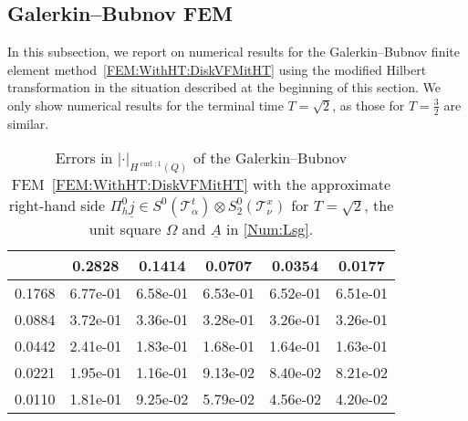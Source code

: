 \documentclass[a4paper,11pt]{article}
\newcommand{\cu}{\operatorname{curl}}
\renewcommand{\vec}[1]{\underline{#1}}
\newcommand{\abs}[1]{\left\lvert{#1}\right\rvert}
\begin{document}
\subsection{Galerkin--Bubnov FEM}

In this subsection, we report on numerical results for the Galerkin--Bubnov finite element method~\eqref{FEM:WithHT:DiskVFMitHT} using the modified Hilbert transformation in the situation described at the beginning of this section. We only show numerical results for the terminal time $T = \sqrt{2}$, as those for $T=\frac 3 2$ are similar.

\begin{table}[ht!]
	\begin{center}
		\begin{footnotesize}\begin{tabular}{r||c|c|c|c|c}
				\diagbox{$h_x$}{\vspace*{-.1cm}$h_t$} & 0.2828 & 0.1414 & 0.0707 & 0.0354 & 0.0177   \\
				\hline\hline
				0.1768 & 6.77e-01 & 6.58e-01 & 6.53e-01 & 6.52e-01 & 6.51e-01 \\
				0.0884 & 3.72e-01 & 3.36e-01 & 3.28e-01 & 3.26e-01 & 3.26e-01 \\
				0.0442 & 2.41e-01 & 1.83e-01 & 1.68e-01 & 1.64e-01 & 1.63e-01 \\
				0.0221 & 1.95e-01 & 1.16e-01 & 9.13e-02 & 8.40e-02 & 8.21e-02 \\
				0.0110 & 1.81e-01 & 9.25e-02 & 5.79e-02 & 4.56e-02 & 4.20e-02
		\end{tabular}\end{footnotesize}
		\caption{Errors in $\abs{\cdot}_{H^{\cu;1}(Q)}$ of the Galerkin--Bubnov FEM~\eqref{FEM:WithHT:DiskVFMitHT} with the approximate right-hand side $\Pi_h^0 \vec j \in S^0(\mathcal T^t_\alpha) \otimes S_2^0(\mathcal T^x_\nu)$ for $T=\sqrt{2}$, the unit square $\Omega$ and $\vec A$ in \eqref{Num:Lsg}.} \label{Num:Tab:MitConstH1Curl}
	\end{center}
\end{table}
\end{document}
